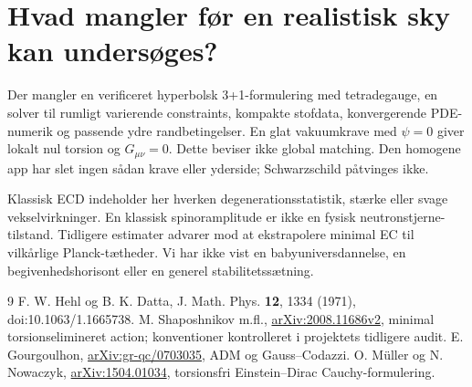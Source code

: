 \documentclass[11pt,a4paper]{article}
\begin{document}
\section{Hvad mangler før en realistisk sky kan undersøges?}
Der mangler en verificeret hyperbolsk 3+1-formulering med tetradegauge, en solver til rumligt varierende constraints, kompakte stofdata, konvergerende PDE-numerik og passende ydre randbetingelser. En glat vakuumkrave med $\psi=0$ giver lokalt nul torsion og $G_{\mu\nu}=0$. Dette beviser ikke global matching. Den homogene app har slet ingen sådan krave eller yderside; Schwarzschild påtvinges ikke.

Klassisk ECD indeholder her hverken degenerationsstatistik, stærke eller svage vekselvirkninger. En klassisk spinoramplitude er ikke en fysisk neutronstjerne-tilstand. Tidligere estimater advarer mod at ekstrapolere minimal EC til vilkårlige Planck-tætheder. Vi har ikke vist en babyuniversdannelse, en begivenhedshorisont eller en generel stabilitetssætning.

\begin{thebibliography}{9}
 F. W. Hehl og B. K. Datta, J. Math. Phys. \textbf{12}, 1334 (1971), doi:10.1063/1.1665738.
 M. Shaposhnikov m.fl., \href{https://arxiv.org/abs/2008.11686}{arXiv:2008.11686v2}, minimal torsionselimineret action; konventioner kontrolleret i projektets tidligere audit.
 E. Gourgoulhon, \href{https://arxiv.org/abs/gr-qc/0703035}{arXiv:gr-qc/0703035}, ADM og Gauss--Codazzi.
 O. M\"uller og N. Nowaczyk, \href{https://arxiv.org/abs/1504.01034}{arXiv:1504.01034}, torsionsfri Einstein--Dirac Cauchy-formulering.
\end{thebibliography}
\end{document}
